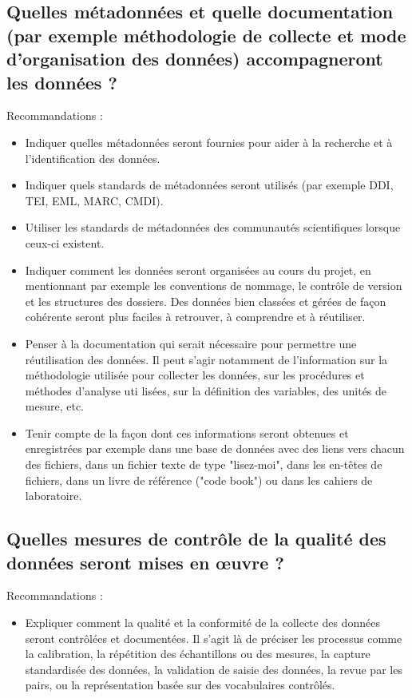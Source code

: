 \documentclass{article}
\begin{document}
\subsection{Quelles métadonnées et quelle documentation (par exemple méthodologie de collecte et mode d'organisation des données) accompagneront les données ?}
Recommandations :
\begin{itemize}
    \item Indiquer quelles métadonnées seront fournies pour aider à la recherche et à l’identification des données.
    \item Indiquer quels standards de métadonnées seront utilisés (par exemple DDI, TEI, EML, MARC, CMDI).
    \item Utiliser les standards de métadonnées des communautés scientifiques lorsque ceux-ci existent.
    \item Indiquer comment les données seront organisées au cours du projet, en mentionnant par exemple les conventions de nommage, le contrôle de version et les structures des dossiers. Des données bien classées et gérées de façon cohérente seront plus faciles à retrouver, à comprendre et à réutiliser.
    \item Penser à la documentation qui serait nécessaire pour permettre une réutilisation des données. Il peut s'agir notamment de l'information sur la méthodologie utilisée pour collecter les données, sur les procédures et méthodes d’analyse uti lisées, sur la définition des variables, des unités de mesure, etc.
    \item Tenir compte de la façon dont ces informations seront obtenues et enregistrées par exemple dans une base de données avec des liens vers chacun des fichiers, dans un fichier texte de type "lisez-moi", dans les en-têtes de fichiers, dans un livre de référence ("code book") ou dans les cahiers de laboratoire.
\end{itemize}

\subsection{Quelles mesures de contrôle de la qualité des données seront mises en œuvre ?}
Recommandations :
\begin{itemize}
    \item Expliquer comment la qualité et la conformité de la collecte des données seront contrôlées et documentées. Il s'agit là de préciser les processus comme la calibration, la répétition des échantillons ou des mesures, la capture standardisée des données, la validation de saisie des données, la revue par les pairs, ou la représentation basée sur des vocabulaires contrôlés.
\end{itemize}
\end{document}
